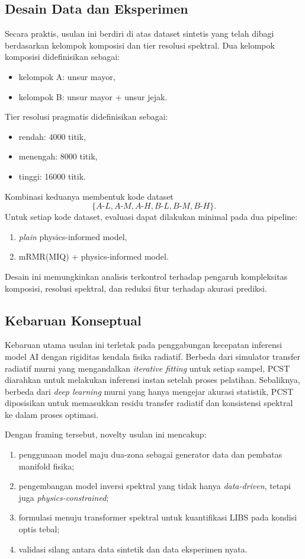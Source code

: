 \subsection{Desain Data dan Eksperimen}
Secara praktis, usulan ini berdiri di atas dataset sintetis yang telah dibagi berdasarkan kelompok komposisi dan tier resolusi spektral. Dua kelompok komposisi didefinisikan sebagai:
\begin{itemize}
    \item kelompok A: unsur mayor,
    \item kelompok B: unsur mayor + unsur jejak.
\end{itemize}
Tier resolusi pragmatis didefinisikan sebagai:
\begin{itemize}
    \item rendah: 4000 titik,
    \item menengah: 8000 titik,
    \item tinggi: 16000 titik.
\end{itemize}
Kombinasi keduanya membentuk kode dataset
\begin{equation}
\{A\text{-}L, A\text{-}M, A\text{-}H, B\text{-}L, B\text{-}M, B\text{-}H\}.
\end{equation}
Untuk setiap kode dataset, evaluasi dapat dilakukan minimal pada dua pipeline:
\begin{enumerate}
    \item \textit{plain} physics-informed model,
    \item mRMR(MIQ) + physics-informed model.
\end{enumerate}
Desain ini memungkinkan analisis terkontrol terhadap pengaruh kompleksitas komposisi, resolusi spektral, dan reduksi fitur terhadap akurasi prediksi.

\subsection{Kebaruan Konseptual}
Kebaruan utama usulan ini terletak pada penggabungan kecepatan inferensi model AI dengan rigiditas kendala fisika radiatif. Berbeda dari simulator transfer radiatif murni yang mengandalkan \textit{iterative fitting} untuk setiap sampel, PCST diarahkan untuk melakukan inferensi instan setelah proses pelatihan. Sebaliknya, berbeda dari \textit{deep learning} murni yang hanya mengejar akurasi statistik, PCST diposisikan untuk memasukkan residu transfer radiatif dan konsistensi spektral ke dalam proses optimasi.

Dengan framing tersebut, novelty usulan ini mencakup:
\begin{enumerate}
    \item penggunaan model maju dua-zona sebagai generator data dan pembatas manifold fisika;
    \item pengembangan model inversi spektral yang tidak hanya \textit{data-driven}, tetapi juga \textit{physics-constrained};
    \item formulasi menuju transformer spektral untuk kuantifikasi LIBS pada kondisi optis tebal;
    \item validasi silang antara data sintetik dan data eksperimen nyata.
\end{enumerate}

